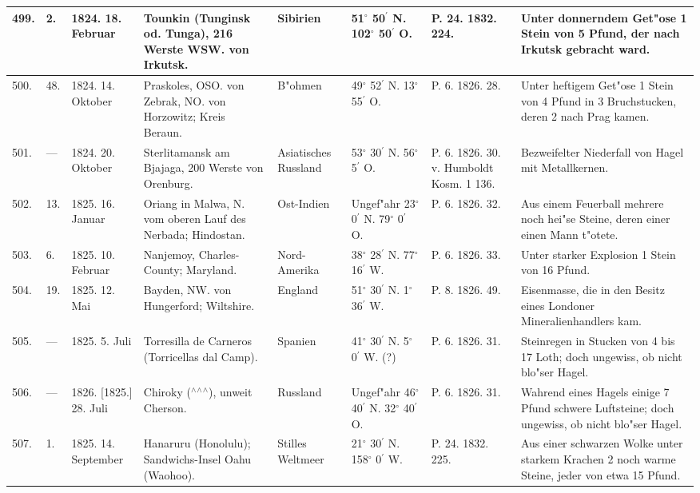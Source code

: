 \documentclass[a4paper, 8pt, oneside, polutonikogreek, german]{article}
\begin{document}
\begin{center}
\begin{longtable}{| p{4mm} | p{2mm} | p{15mm} | p{25mm} | p{16mm} | p{12mm} | p{13mm} | p{20mm} |}
        499. & 2. & 1824. 18. Februar & Tounkin (Tunginsk od. Tunga), 216 Werste WSW. von Irkutsk. & Sibirien & 51$^\circ$ 50$^\prime$ N. 102$^\circ$ 50$^\prime$ O. & P. 24. 1832. 224. & Unter donnerndem Get"ose 1 Stein von 5 Pfund, der nach Irkutsk gebracht ward. \\ \hline
        500. & 48. & 1824. 14. Oktober & Praskoles, OSO. von Zebrak, NO. von Horzowitz; Kreis Beraun. & B"ohmen & 49$^\circ$ 52$^\prime$ N. 13$^\circ$ 55$^\prime$ O. & P. 6. 1826. 28. & Unter heftigem Get"ose 1 Stein von 4 Pfund in 3 Bruchstucken, deren 2 nach Prag kamen. \\ \hline
        501. & --- & 1824. 20. Oktober & Sterlitamansk am Bjajaga, 200 Werste von Orenburg. & Asiatisches Russland & 53$^\circ$ 30$^\prime$ N. 56$^\circ$ 5$^\prime$ O. & P. 6. 1826. 30. v. Humboldt Kosm. 1 136. & Bezweifelter Niederfall von Hagel mit Metallkernen. \\ \hline
        502. & 13. & 1825. 16. Januar & Oriang in Malwa, N. vom oberen Lauf des Nerbada; Hindostan. & Ost-Indien & Ungef"ahr 23$^\circ$ 0$^\prime$ N. 79$^\circ$ 0$^\prime$ O. & P. 6. 1826. 32. & Aus einem Feuerball mehrere noch hei"se Steine, deren einer einen Mann t"otete. \\ \hline
        503. & 6. & 1825. 10. Februar & Nanjemoy, Charles-County; Maryland. & Nord-Amerika & 38$^\circ$ 28$^\prime$ N. 77$^\circ$ 16$^\prime$ W. & P. 6. 1826. 33. & Unter starker Explosion 1 Stein von 16 Pfund. \\ \hline
        504. & 19. & 1825. 12. Mai & Bayden, NW. von Hungerford; Wiltshire. & England & 51$^\circ$ 30$^\prime$ N. 1$^\circ$ 36$^\prime$ W. & P. 8. 1826. 49. & Eisenmasse, die in den Besitz eines Londoner Mineralienhandlers kam. \\ \hline
        505. & --- & 1825. 5. Juli & Torresilla de Carneros (Torricellas dal Camp). & Spanien & 41$^\circ$ 30$^\prime$ N. 5$^\circ$ 0$^\prime$ W. (?) & P. 6. 1826. 31. & Steinregen in Stucken von 4 bis 17 Loth; doch ungewiss, ob nicht blo"ser Hagel. \\ \hline
        506. & --- & 1826. [1825.] 28. Juli & Chiroky ($^\wedge$$^\wedge$$^\wedge$), unweit Cherson. & Russland & Ungef"ahr 46$^\circ$ 40$^\prime$ N. 32$^\circ$ 40$^\prime$ O. & P. 6. 1826. 31. & Wahrend eines Hagels einige 7 Pfund schwere Luftsteine; doch ungewiss, ob nicht blo"ser Hagel. \\ \hline
        507. & 1. & 1825. 14. September & Hanaruru (Honolulu); Sandwichs-Insel Oahu (Waohoo). & Stilles Weltmeer & 21$^\circ$ 30$^\prime$ N. 158$^\circ$ 0$^\prime$ W. & P. 24. 1832. 225. & Aus einer schwarzen Wolke unter starkem Krachen 2 noch warme Steine, jeder von etwa 15 Pfund. \\ \hline

\end{longtable}
\end{center}
\end{document}
